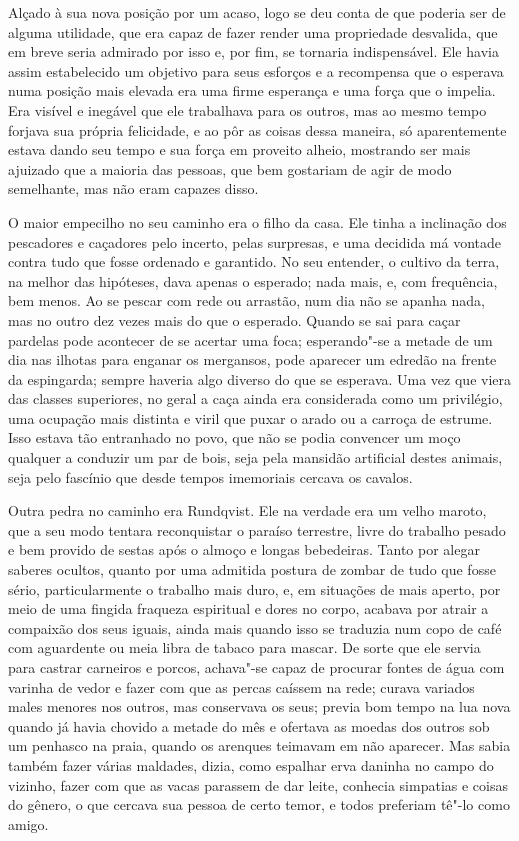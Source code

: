 Alçado à sua nova posição por um acaso, logo se deu conta de que poderia ser de
alguma utilidade, que era capaz de fazer render uma propriedade
desvalida, que em breve seria admirado por isso e, por fim, se tornaria indispensável. Ele
havia assim estabelecido um objetivo para seus esforços e a recompensa que o
esperava numa posição mais elevada era uma firme esperança e uma força que o
impelia. Era visível e inegável que ele trabalhava para os outros, mas ao
mesmo tempo forjava sua própria felicidade, e ao pôr as coisas dessa
maneira, só aparentemente estava dando seu tempo e sua força em proveito
alheio, mostrando ser mais ajuizado que a maioria das pessoas, que bem 
gostariam de agir de modo semelhante, mas não eram capazes disso.

O maior empecilho no seu caminho era o filho da casa. Ele tinha a inclinação dos
pescadores e caçadores pelo incerto, pelas surpresas, e uma decidida má vontade
contra tudo que fosse ordenado e garantido. No seu entender, o
cultivo da terra, na melhor das hipóteses, dava apenas o esperado; nada mais,
e, com frequência, bem menos. Ao se pescar com rede ou arrastão, num dia não se
apanha nada, mas no outro dez vezes mais do que o esperado. Quando se sai para
caçar pardelas pode acontecer de se acertar uma foca; esperando"-se a
metade de um dia nas ilhotas para enganar os mergansos, pode aparecer um
edredão na frente da espingarda; sempre haveria algo diverso
do que se esperava. Uma vez que viera das classes superiores, no geral
a caça ainda era considerada como um privilégio, uma ocupação mais distinta e viril que
puxar o arado ou a carroça de estrume. Isso estava tão entranhado no povo, que
não se podia convencer um moço qualquer a conduzir um par de bois, seja pela
mansidão artificial destes animais, seja pelo fascínio que desde tempos
imemoriais cercava os cavalos.

Outra pedra no caminho era Rundqvist. Ele na verdade era um velho maroto, que 
a seu modo tentara reconquistar o paraíso terrestre, livre do trabalho pesado e
bem provido de sestas após o almoço e longas bebedeiras. Tanto por alegar
saberes ocultos, quanto por uma admitida postura de zombar de tudo que fosse
sério, particularmente o trabalho mais duro, e, em situações de mais aperto,
por meio de uma fingida fraqueza espiritual e dores no corpo, acabava por
atrair a compaixão dos seus iguais, ainda mais quando isso se traduzia num copo
de café com aguardente ou meia libra de tabaco para mascar. De sorte que ele
servia para castrar carneiros e porcos, achava"-se capaz de procurar fontes de
água com varinha de vedor e fazer com que as percas caíssem na rede; curava
variados males menores nos outros, mas conservava os seus; previa bom tempo na
lua nova quando já havia chovido a metade do mês e ofertava as moedas dos
outros sob um penhasco na praia, quando os arenques teimavam em não aparecer.
Mas sabia também fazer várias maldades, dizia, como espalhar erva daninha no
campo do vizinho, fazer com que as vacas parassem de dar leite, conhecia
simpatias e coisas do gênero, o que cercava sua pessoa de certo temor, e
todos preferiam tê"-lo como amigo.

